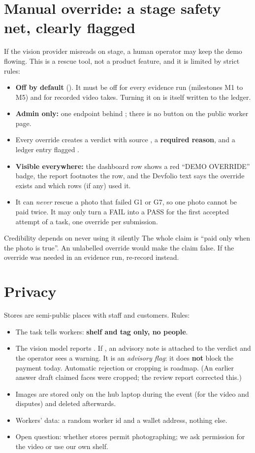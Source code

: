 \section{Manual override: a stage safety net, clearly flagged}
If the vision provider misreads on stage, a human operator may keep the demo flowing. This is a rescue tool, not a product feature, and it is limited by strict rules:

\begin{itemize}
  \item \textbf{Off by default} (). It must be off for every evidence run (milestones M1 to M5) and for recorded video takes. Turning it on is itself written to the ledger.
  \item \textbf{Admin only:} one endpoint behind ; there is no button on the public worker page.
  \item Every override creates a verdict with source , a \textbf{required reason}, and a ledger entry flagged .
  \item \textbf{Visible everywhere:} the dashboard row shows a red ``DEMO OVERRIDE'' badge, the report footnotes the row, and the Devfolio text says the override exists and which rows (if any) used it.
  \item It can \emph{never} rescue a photo that failed G1 or G7, so one photo cannot be paid twice. It may only turn a FAIL into a PASS for the first accepted attempt of a task, one override per submission.
\end{itemize}

\begin{warningbox}{Credibility depends on never using it silently}
The whole claim is ``paid only when the photo is true''. An unlabelled override would make the claim false. If the override was needed in an evidence run, re-record instead.
\end{warningbox}

\section{Privacy}
Stores are semi-public places with staff and customers. Rules:
\begin{itemize}
  \item The task tells workers: \textbf{shelf and tag only, no people}.
  \item The vision model reports . If , an advisory note is attached to the verdict and the operator sees a warning. It is an \emph{advisory flag}: it does \textbf{not} block the payment today. Automatic rejection or cropping is roadmap. (An earlier answer draft claimed faces were cropped; the review report corrected this.)
  \item Images are stored only on the hub laptop during the event (for the video and disputes) and deleted afterwards.
  \item Workers' data: a random worker id and a wallet address, nothing else.
  \item Open question: whether stores permit photographing; we ask permission for the video or use our own shelf.
\end{itemize}

